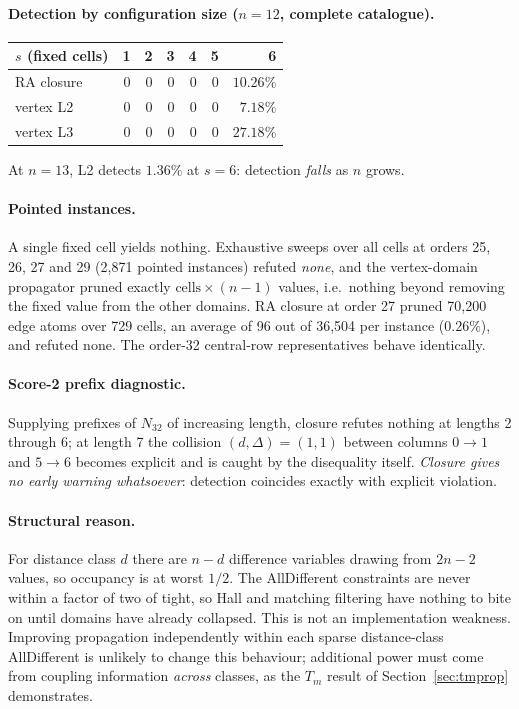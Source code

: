 \documentclass[11pt,a4paper]{article}
\theoremstyle{definition}
\begin{document}
\paragraph{Detection by configuration size ($n=12$, complete catalogue).}
\begin{center}
\begin{tabular}{@{}lrrrrrr@{}}
\toprule
$s$ (fixed cells) & 1 & 2 & 3 & 4 & 5 & 6 \\
\midrule
RA closure & 0 & 0 & 0 & 0 & 0 & $10.26\%$ \\
vertex L2 & 0 & 0 & 0 & 0 & 0 & $7.18\%$ \\
vertex L3 & 0 & 0 & 0 & 0 & 0 & $27.18\%$ \\
\bottomrule
\end{tabular}
\end{center}
At $n=13$, L2 detects $1.36\%$ at $s=6$: detection \emph{falls} as $n$ grows.

\paragraph{Pointed instances.} A single fixed cell yields nothing. Exhaustive
sweeps over all cells at orders 25, 26, 27 and 29 (2{,}871 pointed instances)
refuted \emph{none}, and the vertex-domain propagator pruned exactly
$\text{cells}\times(n-1)$ values, i.e.\ nothing beyond removing the fixed value
from the other domains. RA closure at order 27 pruned 70{,}200 edge atoms over
729 cells, an average of 96 out of 36{,}504 per instance ($0.26\%$), and refuted
none. The order-32 central-row representatives behave identically.

\paragraph{Score-2 prefix diagnostic.} Supplying prefixes of $N_{32}$ of
increasing length, closure refutes nothing at lengths 2 through 6; at length 7
the collision $(d,\Delta)=(1,1)$ between columns $0\to1$ and $5\to6$ becomes
explicit and is caught by the disequality itself. \emph{Closure gives no early
warning whatsoever}: detection coincides exactly with explicit violation.

\paragraph{Structural reason.} For distance class $d$ there are $n-d$ difference
variables drawing from $2n-2$ values, so occupancy is at worst $1/2$. The
AllDifferent constraints are never within a factor of two of tight, so Hall and
matching filtering have nothing to bite on until domains have already collapsed.
This is not an implementation weakness. Improving propagation independently
within each sparse distance-class AllDifferent is unlikely to change this
behaviour; additional power must come from coupling information \emph{across}
classes, as the $T_m$ result of Section~\ref{sec:tmprop} demonstrates.
\end{document}
